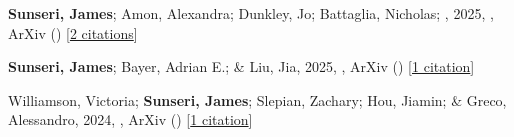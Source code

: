 \item \textbf{Sunseri, James}; Amon, Alexandra; Dunkley, Jo; Battaglia, Nicholas; \etal, 2025, , ArXiv () [\href{https://ui.adsabs.harvard.edu/abs/2025arXiv250520413S}{2 citations}]

\item \textbf{Sunseri, James}; Bayer, Adrian E.; \& Liu, Jia, 2025, , ArXiv () [\href{https://ui.adsabs.harvard.edu/abs/2025arXiv250311778S}{1 citation}]

\item Williamson, Victoria; \textbf{Sunseri, James}; Slepian, Zachary; Hou, Jiamin; \& Greco, Alessandro, 2024, , ArXiv () [\href{https://ui.adsabs.harvard.edu/abs/2024arXiv241203967W}{1 citation}]